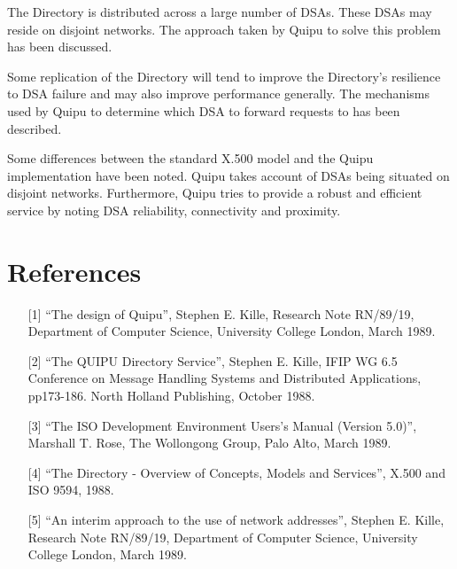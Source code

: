 The Directory is distributed across a large number of DSAs.  These DSAs may
reside on disjoint networks.  The approach taken by Quipu to solve this
problem has been discussed.

Some replication of the Directory will tend to improve the Directory's
resilience to DSA failure and may also improve performance generally.  The 
mechanisms used by Quipu to determine which
DSA to forward requests to has been described.

Some differences between the standard X.500 model and the Quipu
implementation have been noted.  Quipu takes account of DSAs being
situated on disjoint networks.  Furthermore, Quipu tries to provide a robust
and efficient service by noting DSA reliability, connectivity and proximity.

\section{References}

\begin{itemize}
\item[{[1]}]
``The design of Quipu'', Stephen E. Kille, Research Note RN/89/19, Department
of Computer Science, University College London, March 1989.
\item[{[2]}]
``The QUIPU Directory Service'', Stephen E. Kille, IFIP WG 6.5 Conference on
Message Handling Systems and Distributed Applications, pp173-186. North
Holland Publishing, October 1988.
\item[{[3]}]
``The ISO Development Environment Users's Manual (Version 5.0)'', 
Marshall T. Rose, The Wollongong Group, Palo Alto, March 1989.
\item[{[4]}]
``The Directory - Overview of Concepts, Models and Services'', X.500 and ISO
9594, 1988.
\item[{[5]}]
``An interim approach to the use of network addresses'', Stephen E. Kille, 
Research Note RN/89/19, Department of Computer Science, 
University College London, March 1989.
\end{itemize}

